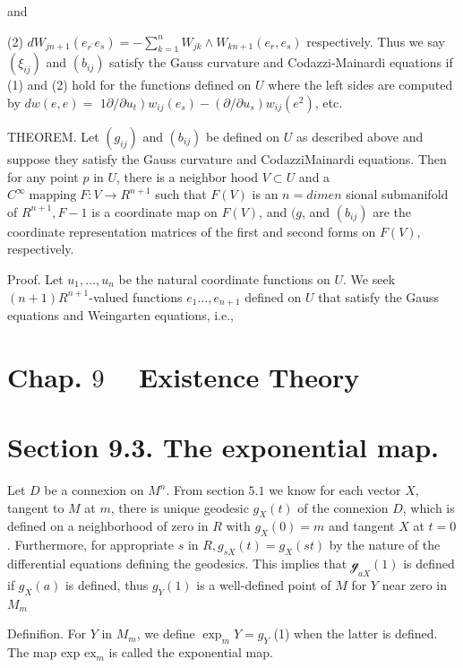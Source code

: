 \documentclass[10pt]{article}
\begin{document}
and

(2) $d W_{j n+1}\left(e_{r^{\prime}} e_{s}\right)=-\sum_{k=1}^{n} W_{j k} \wedge W_{k n+1}\left(e_{r}, e_{s}\right)$ respectively. Thus we say $\left(\xi_{i j}\right)$ and $\left(b_{i j}\right)$ satisfy the Gauss curvature and Codazzi-Mainardi equations if (1) and (2) hold for the functions defined on $U$ where the left sides are computed by $d w(e, e)=$ $\left.1 \partial / \partial u_{t}\right) w_{i j}\left(e_{s}\right)-\left(\partial / \partial u_{s}\right) w_{i j}\left(e^{2}\right)$, etc.

THEOREM. Let $\left(g_{i j}\right)$ and $\left(b_{i j}\right)$ be defined on $U$ as described above and suppose they satisfy the Gauss curvature and CodazziMainardi equations. Then for any point $p$ in $U$, there is a neighbor hood $V \subset U$ and a $C^{\infty} \operatorname{mapping} F: V \rightarrow R^{n+1}$ such that $F(V)$ is an $n=d i m e n$ sional submanifold of $R^{n+1}, F-1$ is a coordinate map on $F(V)$, and $(g$, and $\left(b_{i j}\right)$ are the coordinate representation matrices of the first and second forms on $F(V)$, respectively.

Proof. Let $u_{1}, \ldots, u_{n}$ be the natural coordinate functions on $U$. We seek $(n+1) R^{n+1}$-valued functions $e_{1} \ldots, e_{n+1}$ defined on $U$ that satisfy the Gauss equations and Weingarten equations, i.e.,


\section{Chap. $9 \quad$ Existence Theory}
\section{Section 9.3. The exponential map.}
Let $D$ be a connexion on $M^{n}$. From section $5.1$ we know for each vector $X$, tangent to $M$ at $m$, there is unique geodesic $g_{X}(t)$ of the connexion $D$, which is defined on a neighborhood of zero in $R$ with $g_{X}(0)=m$ and tangent $X$ at $t=0$. Furthermore, for appropriate $s$ in $R, g_{s X}(t)=g_{X}(s t)$ by the nature of the differential equations defining the geodesics. This implies that $\mathscr{g}_{a X}(1)$ is defined if $g_{X}(a)$ is defined, thus $g_{Y}(1)$ is a well-defined point of $M$ for $Y$ near zero in $M_{m}$

Definifion. For $Y$ in $M_{m}$, we define $\exp _{m} Y=g_{Y}$ (1) when the latter is defined. The map exp $\mathrm{ex}_{m}$ is called the exponential map.
\end{document}
